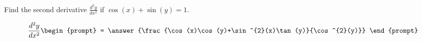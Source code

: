 \documentclass{ximera}
\author{Gregory Hartman \and Matthew Carr}
\begin{document}
\begin{exercise}





Find the second derivative $\frac{d^2y}{dx^2}$ if $\cos(x)+\sin(y)=1$.

\[
\frac{d^2y}{dx^2}
\begin{prompt}
= \answer{\frac{\cos(x)\cos(y)+\sin^{2}(x)\tan(y)}{\cos^{2}(y)}}
\end{prompt}
\]

\end{exercise}
\end{document}

